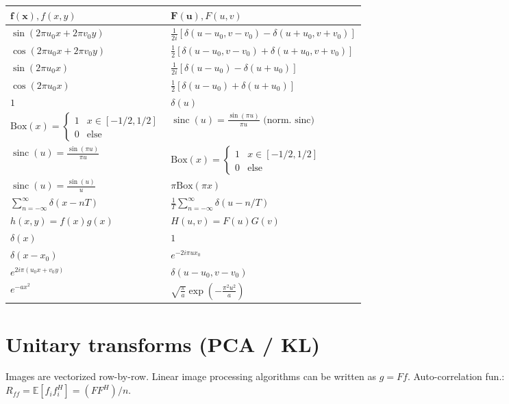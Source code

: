 \documentclass[a4paper,9pt]{article}
\begin{document}
\begin{table}[h]
\centering
\renewcommand{\arraystretch}{1.8}
\begin{tabular}{@{} l l @{}}
\toprule
$\mathbf{f(x)}, f(x,y)$ & $\mathbf{F(u)}, F(u, v)$ \\
\midrule
$\sin(2 \pi u_0 x + 2 \pi v_0 y)$ & $\frac{1}{2i} [\delta(u - u_0, v - v_0) - \delta(u + u_0, v + v_0)]$ \\
$\cos(2 \pi u_0 x + 2 \pi v_0 y)$ & $\frac{1}{2} [\delta(u - u_0, v - v_0) + \delta(u + u_0, v + v_0)]$ \\
$\sin(2 \pi u_0 x)$ & $\frac{1}{2i} [\delta(u - u_0) - \delta(u + u_0)]$ \\
$\cos(2 \pi u_0 x)$ & $\frac{1}{2} [\delta(u - u_0) + \delta(u + u_0)]$ \\
$1$ & $\delta(u)$ \\
$\text{Box}(x) = \begin{cases} 1 & x \in [-1/2, 1/2] \\ 0 & \text{else} \end{cases}$ & $\operatorname{sinc}(u) = \frac{\sin(\pi u)}{\pi u} \text{ (norm. sinc)}$ \\
$\operatorname{sinc}(u) = \frac{\sin(\pi u)}{\pi u}$ & $\text{Box}(x) = \begin{cases} 1 & x \in [-1/2, 1/2] \\ 0 & \text{else} \end{cases}$ \\
$\operatorname{sinc}(u) = \frac{\sin(u)}{u}$ & $\pi \text{Box}(\pi x)$ \\
$\sum_{n=-\infty}^\infty \delta(x - n T)$ & $\frac{1}{T} \sum_{n=-\infty}^\infty \delta(u - n/T)$ \\
$h(x,y) = f(x)g(x)$ & $H(u, v) = F(u) G(v)$ \\
$\delta(x)$ & $1$ \\
$\delta(x - x_0)$ & $e^{-2 i \pi u x_0}$ \\
$e^{2 i \pi(u_0 x + v_0 y)}$ & $\delta(u - u_0, v - v_0)$ \\
$e^{-a x^2}$ & $\sqrt{\frac{\pi}{a}} \exp\left(-\frac{\pi^2 u^2}{a}\right)$ \\
\bottomrule
\end{tabular}
\end{table}


\section{Unitary transforms (PCA / KL)}
Images are vectorized row-by-row. Linear image processing algorithms can be written as $g = F f$. Auto-correlation fun.: $R_{ff} = \mathbb{E}[f_i f_i^H] = (F F^H) / n$.
\end{document}
